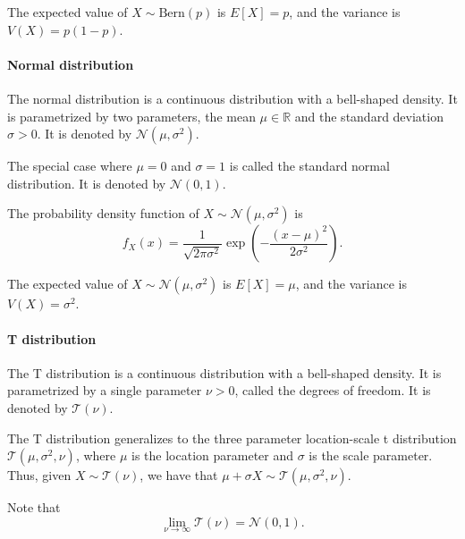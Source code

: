The expected value of $X \sim \text{Bern}(p)$ is $E[X] = p$, and the variance is
$V(X) = p(1 - p)$.

\paragraph{Normal distribution} The normal distribution is a continuous distribution
with a bell-shaped density.  It is parametrized by two parameters, the mean $\mu \in
\mathbb{R}$ and the standard deviation $\sigma > 0$.  It is denoted by
$\mathcal{N}(\mu, \sigma^2)$.

The special case where $\mu = 0$ and $\sigma = 1$ is called the standard normal
distribution.  It is denoted by $\mathcal{N}(0, 1)$.

The probability density function of $X \sim \mathcal{N}(\mu, \sigma^2)$ is
\begin{equation}
  \label{eq:normal}
  f_X(x) = \frac{1}{\sqrt{2 \pi \sigma^2}} \exp\left(-\frac{(x - \mu)^2}{2 \sigma^2}\right)\text{.}
\end{equation}

The expected value of $X \sim \mathcal{N}(\mu, \sigma^2)$ is $E[X] = \mu$, and the
variance is $V(X) = \sigma^2$.

\paragraph{T distribution} The T distribution is a continuous distribution with a
bell-shaped density.  It is parametrized by a single parameter $\nu > 0$, called the
degrees of freedom.  It is denoted by $\mathcal{T}(\nu)$.


The T distribution generalizes to the three parameter location-scale t distribution
$\mathcal{T}(\mu, \sigma^2, \nu)$, where $\mu$ is the location parameter and $\sigma$ is
the scale parameter.  Thus, given $X \sim \mathcal{T}(\nu)$, we have that
$\mu + \sigma X \sim \mathcal{T}(\mu, \sigma^2, \nu)$.

Note that $$\lim_{\nu \rightarrow \infty} \mathcal{T}(\nu) = \mathcal{N}(0, 1)\text{.}$$


